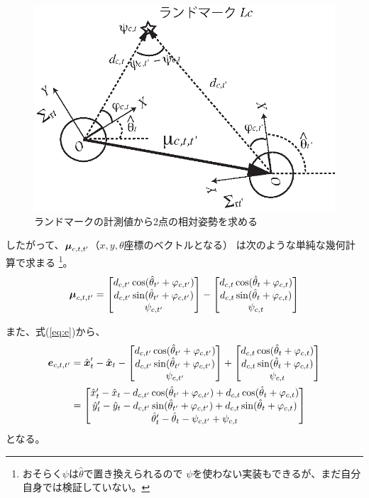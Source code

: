 \begin{figure}[htbp]
	\begin{center}
		\includegraphics[width=0.5\linewidth]{./figs/two_poses.eps}
		\caption{ランドマークの計測値から2点の相対姿勢を求める}
		\label{fig:two_poses}
	\end{center}
\end{figure}

したがって、$\boldsymbol{\mu}_{c,t,t'}$（$x,y,\theta$座標のベクトルとなる）
は次のような単純な幾何計算で求まる
\footnote{おそらく$\psi$は$\hat\theta$で置き換えられるので
$\psi$を使わない実装もできるが、まだ自分自身では検証していない。}。
\begin{align}
	\boldsymbol{\mu}_{c,t,t'} =
	\begin{bmatrix}
	d_{c,t'} \cos(\hat{\theta}_{t'} + \varphi_{c,t'}) \\
	d_{c,t'} \sin(\hat{\theta}_{t'} + \varphi_{c,t'}) \\
	\psi_{c,t'}
	\end{bmatrix}
	- 
	\begin{bmatrix}
	d_{c,t} \cos(\hat{\theta}_t + \varphi_{c,t}) \\
	d_{c,t} \sin(\hat{\theta}_t + \varphi_{c,t}) \\
	\psi_{c,t}
	\end{bmatrix}
\end{align}

また、式(\ref{eq:e})から、
\begin{align}
	\boldsymbol{e}_{c,t,t'} &= \hat{\boldsymbol{x}}_t' - \hat{\boldsymbol{x}}_t -
	\begin{bmatrix}
	d_{c,t'} \cos(\hat{\theta}_{t'} + \varphi_{c,t'}) \\
	d_{c,t'} \sin(\hat{\theta}_{t'} + \varphi_{c,t'}) \\
	\psi_{c,t'}
	\end{bmatrix}
	+ 
	\begin{bmatrix}
	d_{c,t} \cos(\hat{\theta}_t + \varphi_{c,t}) \\
	d_{c,t} \sin(\hat{\theta}_t + \varphi_{c,t}) \\
	\psi_{c,t}
	\end{bmatrix} \nonumber \\
	&= 
	\begin{bmatrix}
		\hat{x}_t' - \hat{x}_t 
		- d_{c,t'} \cos(\hat{\theta}_{t'} + \varphi_{c,t'}) + d_{c,t} \cos(\hat{\theta}_t + \varphi_{c,t}) \\
		\hat{y}_t' - \hat{y}_t 
	- d_{c,t'} \sin(\hat{\theta}_{t'} + \varphi_{c,t'}) + d_{c,t} \sin(\hat{\theta}_t + \varphi_{c,t}) \\
		\hat{\theta}_t' - \hat{\theta}_t 
	- \psi_{c,t'} + \psi_{c,t}
	\end{bmatrix} \label{eq:e2}
\end{align}
となる。

